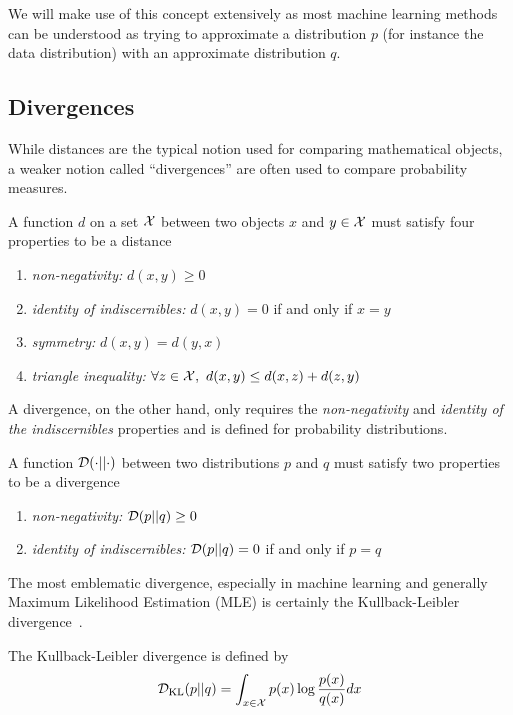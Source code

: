 We will make use of this concept extensively as most machine learning methods can be understood as trying to approximate a distribution $p$ (for instance the data distribution) with an approximate distribution $q$.



\subsection{Divergences}
While distances are the typical notion used for comparing mathematical objects, a weaker notion called ``divergences'' are often used to compare probability measures.



\begin{definition}[Distance]
A function $d$ on a set ${\mathcal{X}}$ between two objects $x$ and $y \in {\mathcal{X}}$ must satisfy four properties to be a distance
\begin{enumerate}
    \item \emph{non-negativity:} $d(x, y) \ge 0$
    \item \emph{identity of indiscernibles:} $d(x,y) = 0$ if and only if $x = y$
    \item \emph{symmetry:} $d(x,y) = d(y,x)$
    \item \emph{triangle inequality:} $\forall z \in {\mathcal{X}}, \ d(x, y) \le d(x,z) + d(z, y) $
\end{enumerate}
\end{definition}

A divergence, on the other hand, only requires the \emph{non-negativity} and \emph{identity of the indiscernibles} properties and is defined for probability distributions.

\begin{definition}[Divergence]
A function ${\mathcal{D}}(\cdot || \cdot)$ between two distributions $p$ and $q$ must satisfy two properties to be a divergence
\begin{enumerate}
    \item \emph{non-negativity:} ${\mathcal{D}}(p||q) \ge 0$
    \item\emph{identity of indiscernibles:} ${\mathcal{D}}(p||q) = 0$ if and only if $p = q$
\end{enumerate}
\end{definition}


The most emblematic divergence, especially in machine learning and generally Maximum Likelihood Estimation (MLE) is certainly the Kullback-Leibler divergence~\citep{kullback1951information, kullback1997information}.
\begin{example} The Kullback-Leibler divergence is defined by
\begin{equation}
\label{eq:kl}
    {\mathcal{D}}_{\mathrm{KL}}(p||q) = \int_{x \in {\mathcal{X}}} p(x) \log \frac{p(x)}{q(x)}  dx
\end{equation}
\end{example}

